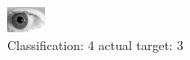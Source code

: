 \begin{figure}[h!]
\begin{center}
\includegraphics[width=0.60\columnwidth]{figures/ID224_class_4_target_3.png}
\end{center}
\caption{ Classification: 4 actual target: 3}
\label{fig:ID224_class_4_target_3}
\end{figure}
